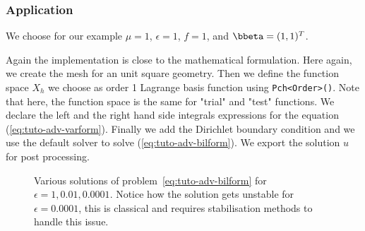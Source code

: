 \subsubsection{Application}

We choose for our example $\mu = 1$, $\epsilon = 1$, $f=1$, and
$\bbeta=(1,1)^T$.

%
\vspace{2mm}

\vspace{2mm}
%
Again the implementation is close to the mathematical formulation.  Here again,
we create the mesh for an unit square geometry. Then we define the function
space $X_h$ we choose as order 1 Lagrange basis function using
\lstinline!Pch<Order>()!.  Note that here, the function space is the same for
"trial" and "test" functions.  We declare the left and the right hand side
integrals expressions for the equation (\ref{eq:tuto-adv-varform}). Finally we
add the Dirichlet boundary condition and we use the default solver to solve
(\ref{eq:tuto-adv-bilform}).  We export the solution $u$ for post processing.



\begin{figure}[htbp]
  \centering
  \caption{Various solutions of problem~\eqref{eq:tuto-adv-bilform}  for $\epsilon=1,0.01,0.0001$. Notice how
  the solution gets unstable for $\epsilon=0.0001$, this is classical and
  requires stabilisation methods to handle this issue.}
  \label{fig:tut:1}
\end{figure}


